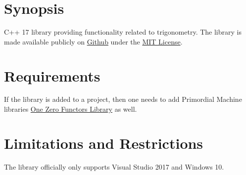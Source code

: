 \documentclass[oneside]{article}
\begin{document}
\maketitle
\tableofcontents
\section{Synopsis}
C++ 17 library providing functionality related to trigonometry.
The library is made available publicly on
\href{\GetLibraryRepository}{Github}
under the
\href{\GetLibraryRepository/blob/master/LICENSE}{MIT License}.

\section{Requirements}
If the library is added to a project, then one needs to add Primordial Machine libraries
\href{https://github.com/primordialmachine/one-zero-functors}{One Zero Functors Library}
as well.

\section{Limitations and Restrictions}
The library officially only supports Visual Studio 2017 and Windows 10.

\end{document}
